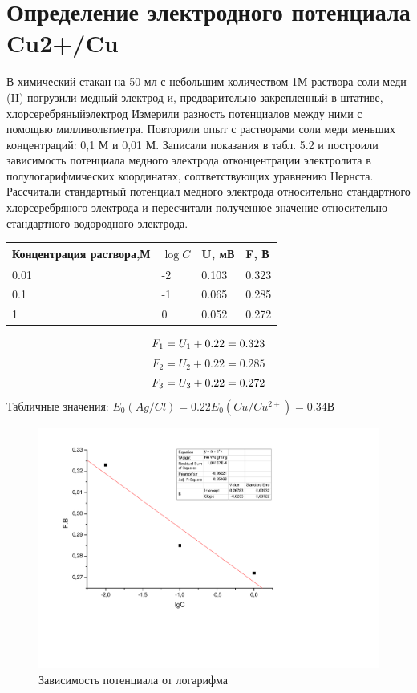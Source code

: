 \documentclass[a4paper,12pt]{article}
\begin{document}
\section{Определение электродного потенциала Cu2+/Cu} 
В химический стакан на 50 мл с небольшим количеством 1М раствора соли меди (II)
погрузили медный электрод и, предварительно закрепленный в штативе, хлорсеребряныйэлектрод
Измерили разность потенциалов между ними с помощью милливольтметра. Повторили опыт с растворами соли меди меньших концентраций: 0,1 М и 0,01 М. Записали
показания в табл. 5.2 и построили зависимость потенциала медного электрода отконцентрации электролита в полулогарифмических координатах, соответствующих
уравнению Нернста. Рассчитали стандартный потенциал медного электрода относительно стандартного хлорсеребряного электрода и пересчитали полученное
значение относительно стандартного водородного электрода. 
\begin{table}[!ht]
    \centering
    \begin{tabular}{|l|l|l|l|}
    \hline
        Концентрация раствора,М & $\log{C}$ & U, мВ & F, В \\ \hline
        0.01 & -2 & 0.103& 0.323 \\ \hline
        0.1 & -1 & 0.065 & 0.285\\ \hline
        1 & 0 & 0.052 & 0.272 \\ \hline
    \end{tabular}
\end{table}
\begin{equation}
    F_1=U_1+0.22=0.323 \newline
\end{equation}
\begin{equation}
     F_2=U_2+0.22=0.285
\end{equation}
\begin{equation}
     F_3=U_3+0.22=0.272\newline
\end{equation}
Табличные значения: $E_0(Ag/Cl)=0.22 E_0(Cu/Cu^{2+})=0.34В$
\begin{figure}[h] 
 
\centering 
 
\includegraphics[scale=0.7]{nernst.pdf} 
 
\caption{Зависимость потенциала от логарифма} 
 
\label{fig:mpr} 
\end{figure}  
\end{document}

